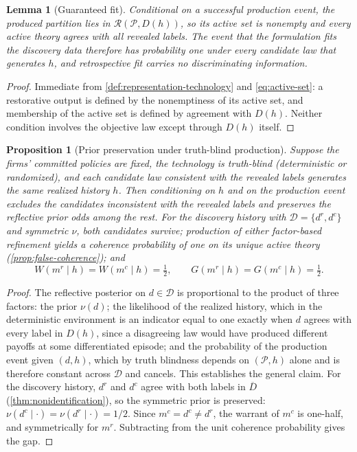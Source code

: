 \documentclass[11pt]{article}
\newtheorem{lemma}[assumption]{Lemma}
\newtheorem{proposition}[assumption]{Proposition}
\begin{document}
\begin{lemma}[Guaranteed fit]
\label{lem:guaranteed-fit}
Conditional on a successful production event, the produced partition lies in
$\mathcal R(\mathcal P,D(h))$, so its active set is nonempty and every active
theory agrees with all revealed labels.  The event that the formulation fits
the discovery data therefore has probability one under every candidate law
that generates $h$, and retrospective fit carries no discriminating
information.
\end{lemma}

\begin{proof}
Immediate from \cref{def:representation-technology} and \cref{eq:active-set}:
a restorative output is defined by the nonemptiness of its active set, and
membership of the active set is defined by agreement with $D(h)$.  Neither
condition involves the objective law except through $D(h)$ itself.
\end{proof}

\begin{proposition}[Prior preservation under truth-blind production]
\label{prop:prior-preservation}
Suppose the firms' committed policies are fixed, the technology is truth-blind
(deterministic or randomized), and each candidate law consistent with the
revealed labels generates the same realized history $h$.  Then conditioning on
$h$ and on the production event excludes the candidates inconsistent with the
revealed labels and preserves the reflective prior odds among the rest.  For
the discovery history with $\mathcal D=\{d^r,d^c\}$ and symmetric $\nu$, both
candidates survive; production of either factor-based refinement yields a
coherence probability of one on its unique active theory
(\cref{prop:false-coherence}); and
\[
W(m^r\mid h)=W(m^c\mid h)=\tfrac12,
\qquad
G(m^r\mid h)=G(m^c\mid h)=\tfrac12.
\]
\end{proposition}

\begin{proof}
The reflective posterior on $d\in\mathcal D$ is proportional to the product of
three factors: the prior $\nu(d)$; the likelihood of the realized history,
which in the deterministic environment is an indicator equal to one exactly
when $d$ agrees with every label in $D(h)$, since a disagreeing law would have
produced different payoffs at some differentiated episode; and the probability
of the production event given $(d,h)$, which by truth blindness depends on
$(\mathcal P,h)$ alone and is therefore constant across $\mathcal D$ and
cancels.  This establishes the general claim.  For the discovery history,
$d^r$ and $d^c$ agree with both labels in $\overline D$
(\cref{thm:nonidentification}), so the symmetric prior is preserved:
$\nu(d^c\mid\cdot)=\nu(d^r\mid\cdot)=1/2$.  Since $m^c=d^c\neq d^r$, the
warrant of $m^c$ is one-half, and symmetrically for $m^r$.  Subtracting from
the unit coherence probability gives the gap.
\end{proof}
\end{document}
